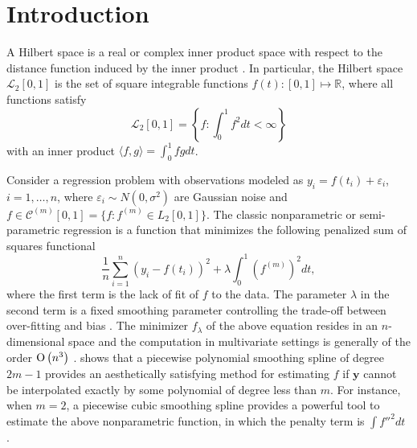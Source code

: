 

\section{Introduction}

A Hilbert space is a real or complex inner product space with respect to the distance function induced by the inner product \citep{dieudonne2013foundations}. In particular, the Hilbert space $\mathcal{L}_2[0,1]$ is the set of square integrable functions $f(t):[0,1]\mapsto \mathbb{R}$, where all functions satisfy 
\begin{equation}
\mathcal{L}_2[0,1] =\left\lbrace f:\int_0^1f^2dt <\infty \right\rbrace
\end{equation}
with an inner product $\langle f,g\rangle=\int_0^1fgdt$. 

Consider a regression problem with observations modeled as $y_i = f(t_i)+\varepsilon_i$, $i=1,\ldots,n$, where $\varepsilon_i\sim N(0,\sigma^2)$ are \iid Gaussian noise and $f\in\mathcal{C}^{(m)}[0,1]=\{f:f^{(m)}\in \mathit{L}_2[0,1]\}$. The classic nonparametric or semi-parametric regression is a function that minimizes the following penalized sum of squares functional 
\begin{equation}\label{GaussianProcessGeneralObjective}
\frac{1}{n}\sum_{i=1}^{n}\left( y_i-f(t_i) \right)^2 + \lambda \int_{0}^{1} \left( f^{(m)}\right)^2dt, 
\end{equation}
where the first term is the lack of fit of $f$ to the data. The parameter $\lambda$ in the second term is a fixed smoothing parameter controlling the trade-off between over-fitting and bias \citep{esl2009}. The minimizer $f_\lambda$ of the above equation resides in an $n$-dimensional space and the computation in multivariate settings is generally of the order ${\rm O}\left(n^3\right)$ \citep{kim2004smoothing}. \cite{schoenberg1964spline} shows that a piecewise polynomial smoothing spline of degree $2m-1$ provides an aesthetically satisfying method for estimating $f$ if $\mathbf{y}$ cannot be interpolated exactly by some polynomial of degree less than $m$. For instance, when $m=2$, a piecewise cubic smoothing spline provides a powerful tool to estimate the above nonparametric function, in which the penalty term is $\int f''^2dt$ \citep{hastie1990generalized}. 


